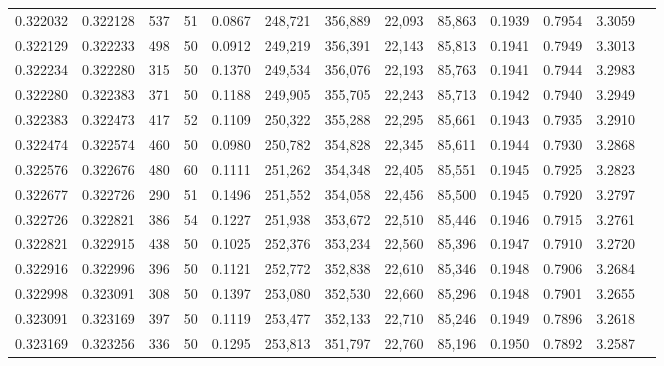 \begin{tabular}{rrrrrrrrrrrrr}
0.322032 & 0.322128 &   537 &  51 &                                     0.0867 & 248,721 & 356,889 &  22,093 &  85,863 & 0.1939 & 0.7954 & 3.3059 \\
0.322129 & 0.322233 &   498 &  50 &                                     0.0912 & 249,219 & 356,391 &  22,143 &  85,813 & 0.1941 & 0.7949 & 3.3013 \\
0.322234 & 0.322280 &   315 &  50 &                                     0.1370 & 249,534 & 356,076 &  22,193 &  85,763 & 0.1941 & 0.7944 & 3.2983 \\
0.322280 & 0.322383 &   371 &  50 &                                     0.1188 & 249,905 & 355,705 &  22,243 &  85,713 & 0.1942 & 0.7940 & 3.2949 \\
0.322383 & 0.322473 &   417 &  52 &                                     0.1109 & 250,322 & 355,288 &  22,295 &  85,661 & 0.1943 & 0.7935 & 3.2910 \\
0.322474 & 0.322574 &   460 &  50 &                                     0.0980 & 250,782 & 354,828 &  22,345 &  85,611 & 0.1944 & 0.7930 & 3.2868 \\
0.322576 & 0.322676 &   480 &  60 &                                     0.1111 & 251,262 & 354,348 &  22,405 &  85,551 & 0.1945 & 0.7925 & 3.2823 \\
0.322677 & 0.322726 &   290 &  51 &                                     0.1496 & 251,552 & 354,058 &  22,456 &  85,500 & 0.1945 & 0.7920 & 3.2797 \\
0.322726 & 0.322821 &   386 &  54 &                                     0.1227 & 251,938 & 353,672 &  22,510 &  85,446 & 0.1946 & 0.7915 & 3.2761 \\
0.322821 & 0.322915 &   438 &  50 &                                     0.1025 & 252,376 & 353,234 &  22,560 &  85,396 & 0.1947 & 0.7910 & 3.2720 \\
0.322916 & 0.322996 &   396 &  50 &                                     0.1121 & 252,772 & 352,838 &  22,610 &  85,346 & 0.1948 & 0.7906 & 3.2684 \\
0.322998 & 0.323091 &   308 &  50 &                                     0.1397 & 253,080 & 352,530 &  22,660 &  85,296 & 0.1948 & 0.7901 & 3.2655 \\
0.323091 & 0.323169 &   397 &  50 &                                     0.1119 & 253,477 & 352,133 &  22,710 &  85,246 & 0.1949 & 0.7896 & 3.2618 \\
0.323169 & 0.323256 &   336 &  50 &                                     0.1295 & 253,813 & 351,797 &  22,760 &  85,196 & 0.1950 & 0.7892 & 3.2587 \\

\end{tabular}
